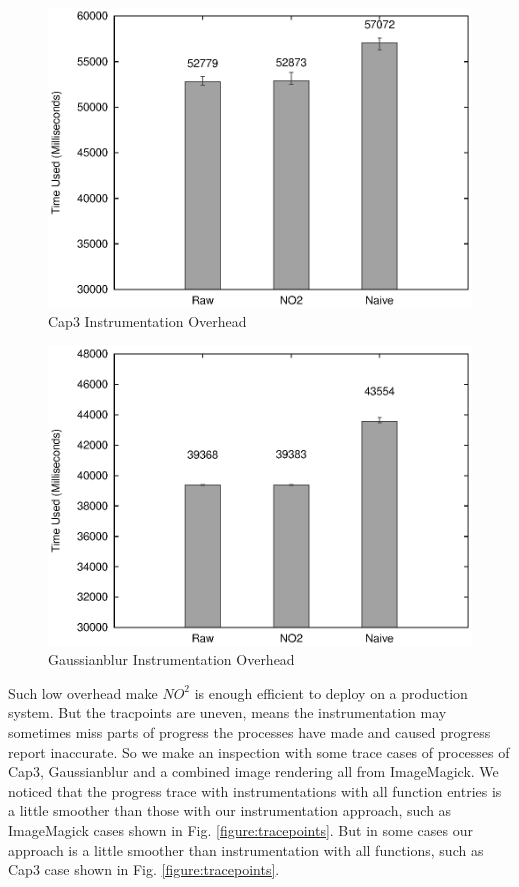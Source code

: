 \begin{figure}
\centering
  \includegraphics[width=0.9\columnwidth]{figures/overhead_cap3.eps}
\caption{Cap3 Instrumentation Overhead}
\label{figure:overhead_cap3}
\end{figure}

\begin{figure}
\centering
  \includegraphics[width=0.9\columnwidth]{figures/overhead_gaussianblur.eps}
\caption{Gaussianblur Instrumentation Overhead}
\label{figure:overhead_gaussianblur}
\end{figure}

Such low overhead make $NO^2$ is enough efficient to deploy on a production system. But the tracpoints are uneven, means the instrumentation may sometimes miss parts of progress the processes have made and caused progress report inaccurate. So we make an inspection with some trace cases of processes of Cap3, Gaussianblur and a combined image rendering all from ImageMagick. We noticed that the progress trace with instrumentations with all function entries is a little smoother than those with our instrumentation approach, such as ImageMagick cases shown in Fig. \ref{figure:tracepoints}. But in some cases our approach is a little smoother than instrumentation with all functions, such as Cap3 case shown in Fig. \ref{figure:tracepoints}.

